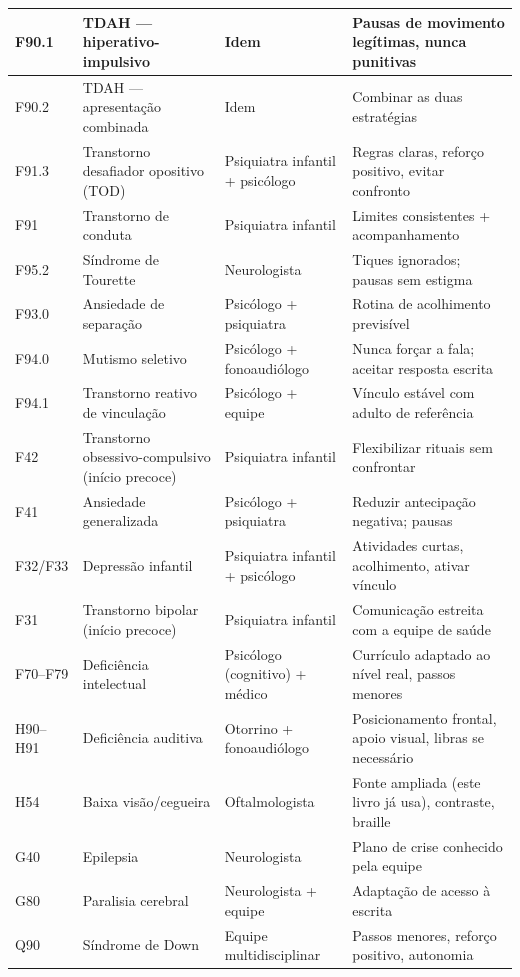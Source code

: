 \begin{center}
{\begin{tabular}{|l|p{5.5cm}|p{4.5cm}|p{4cm}|}
\hline
F90.1 & TDAH --- hiperativo-impulsivo & Idem & Pausas de movimento legítimas, nunca punitivas \\
\hline
F90.2 & TDAH --- apresentação combinada & Idem & Combinar as duas estratégias \\
\hline
F91.3 & Transtorno desafiador opositivo (TOD) & Psiquiatra infantil + psicólogo & Regras claras, reforço positivo, evitar confronto \\
\hline
F91 & Transtorno de conduta & Psiquiatra infantil & Limites consistentes + acompanhamento \\
\hline
F95.2 & Síndrome de Tourette & Neurologista & Tiques ignorados; pausas sem estigma \\
\hline
F93.0 & Ansiedade de separação & Psicólogo + psiquiatra & Rotina de acolhimento previsível \\
\hline
F94.0 & Mutismo seletivo & Psicólogo + fonoaudiólogo & Nunca forçar a fala; aceitar resposta escrita \\
\hline
F94.1 & Transtorno reativo de vinculação & Psicólogo + equipe & Vínculo estável com adulto de referência \\
\hline
F42 & Transtorno obsessivo-compulsivo (início precoce) & Psiquiatra infantil & Flexibilizar rituais sem confrontar \\
\hline
F41 & Ansiedade generalizada & Psicólogo + psiquiatra & Reduzir antecipação negativa; pausas \\
\hline
F32/F33 & Depressão infantil & Psiquiatra infantil + psicólogo & Atividades curtas, acolhimento, ativar vínculo \\
\hline
F31 & Transtorno bipolar (início precoce) & Psiquiatra infantil & Comunicação estreita com a equipe de saúde \\
\hline
F70--F79 & Deficiência intelectual & Psicólogo (cognitivo) + médico & Currículo adaptado ao nível real, passos menores \\
\hline
H90--H91 & Deficiência auditiva & Otorrino + fonoaudiólogo & Posicionamento frontal, apoio visual, libras se necessário \\
\hline
H54 & Baixa visão/cegueira & Oftalmologista & Fonte ampliada (este livro já usa), contraste, braille \\
\hline
G40 & Epilepsia & Neurologista & Plano de crise conhecido pela equipe \\
\hline
G80 & Paralisia cerebral & Neurologista + equipe & Adaptação de acesso à escrita \\
\hline
Q90 & Síndrome de Down & Equipe multidisciplinar & Passos menores, reforço positivo, autonomia \\

\end{tabular}}
\end{center}
